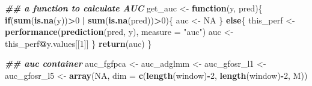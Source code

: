\documentclass[
]{article}
\newenvironment{Shaded}{\begin{snugshade}}{\end{snugshade}}
\newcommand{\AttributeTok}[1]{\textcolor[rgb]{0.13,0.29,0.53}{#1}}
\newcommand{\ConstantTok}[1]{\textcolor[rgb]{0.56,0.35,0.01}{#1}}
\newcommand{\ControlFlowTok}[1]{\textcolor[rgb]{0.13,0.29,0.53}{\textbf{#1}}}
\newcommand{\DecValTok}[1]{\textcolor[rgb]{0.00,0.00,0.81}{#1}}
\newcommand{\DocumentationTok}[1]{\textcolor[rgb]{0.56,0.35,0.01}{\textbf{\textit{#1}}}}
\newcommand{\FunctionTok}[1]{\textcolor[rgb]{0.13,0.29,0.53}{\textbf{#1}}}
\newcommand{\NormalTok}[1]{#1}
\newcommand{\OtherTok}[1]{\textcolor[rgb]{0.56,0.35,0.01}{#1}}
\newcommand{\SpecialCharTok}[1]{\textcolor[rgb]{0.81,0.36,0.00}{\textbf{#1}}}
\newcommand{\StringTok}[1]{\textcolor[rgb]{0.31,0.60,0.02}{#1}}
\begin{document}
\begin{Shaded}
\begin{Highlighting}[]
\DocumentationTok{\#\# a function to calculate AUC}
\NormalTok{get\_auc }\OtherTok{\textless{}{-}} \ControlFlowTok{function}\NormalTok{(y, pred)\{}
  \ControlFlowTok{if}\NormalTok{(}\FunctionTok{sum}\NormalTok{(}\FunctionTok{is.na}\NormalTok{(y))}\SpecialCharTok{\textgreater{}}\DecValTok{0} \SpecialCharTok{|} \FunctionTok{sum}\NormalTok{(}\FunctionTok{is.na}\NormalTok{(pred))}\SpecialCharTok{\textgreater{}}\DecValTok{0}\NormalTok{)\{}
\NormalTok{    auc }\OtherTok{\textless{}{-}} \ConstantTok{NA}
\NormalTok{  \}}
  \ControlFlowTok{else}\NormalTok{\{}
\NormalTok{    this\_perf }\OtherTok{\textless{}{-}} \FunctionTok{performance}\NormalTok{(}\FunctionTok{prediction}\NormalTok{(pred, y), }\AttributeTok{measure =} \StringTok{"auc"}\NormalTok{)}
\NormalTok{    auc }\OtherTok{\textless{}{-}}\NormalTok{ this\_perf}\SpecialCharTok{@}\NormalTok{y.values[[}\DecValTok{1}\NormalTok{]]}
\NormalTok{  \}}
  \FunctionTok{return}\NormalTok{(auc)}
\NormalTok{\}}
\end{Highlighting}
\end{Shaded}

\begin{Shaded}
\begin{Highlighting}[]
\DocumentationTok{\#\# auc container }
\NormalTok{auc\_fgfpca }\OtherTok{\textless{}{-}}\NormalTok{ auc\_adglmm }\OtherTok{\textless{}{-}}\NormalTok{ auc\_gfosr\_l1 }\OtherTok{\textless{}{-}}\NormalTok{ auc\_gfosr\_l5 }\OtherTok{\textless{}{-}} 
  \FunctionTok{array}\NormalTok{(}\ConstantTok{NA}\NormalTok{, }\AttributeTok{dim =} \FunctionTok{c}\NormalTok{(}\FunctionTok{length}\NormalTok{(window)}\SpecialCharTok{{-}}\DecValTok{2}\NormalTok{, }\FunctionTok{length}\NormalTok{(window)}\SpecialCharTok{{-}}\DecValTok{2}\NormalTok{, M))}
\end{Highlighting}
\end{Shaded}
\end{document}
